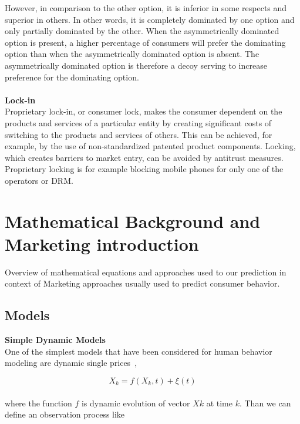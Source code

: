 However, in comparison to the other option, it is inferior in some respects and superior in others.
In other words, it is completely dominated by one option and only partially dominated by the other.
When the asymmetrically dominated option is present, a higher percentage of consumers will prefer the dominating
option than when the asymmetrically dominated option is absent.
The asymmetrically dominated option is therefore a decoy serving to increase preference for the dominating option.\\
\\
\textbf{Lock-in} \label{subsec:lock-in}\\
Proprietary lock-in, or consumer lock, makes the consumer dependent on the products and services of a particular
entity by creating significant costs of switching to the products and services of others.
This can be achieved, for example, by the use of non-standardized patented product components.
Locking, which creates barriers to market entry, can be avoided by antitrust measures.
Proprietary locking is for example blocking mobile phones for only one of the operators or DRM.

\section{Mathematical Background and Marketing introduction} \label{sec:introduction}
Overview of mathematical equations and approaches used to our prediction in context of Marketing approaches usually used to predict consumer behavior.\\
\subsection{Models} \label{subsec:models}
\textbf{Simple Dynamic Models} \label{subsec:simpleDynamicModels}\\
One of the simplest models that have been considered for human behavior modeling are dynamic single prices~\cite{pantland},

\begin{equation} \label{eq:1}
X_k = f(X_k, t) + \xi(t)
\end{equation}
\\
where the function $f$ is dynamic evolution of vector $Xk$ at time $k$.
Than we can define an observation process like~\cite{pantland}

